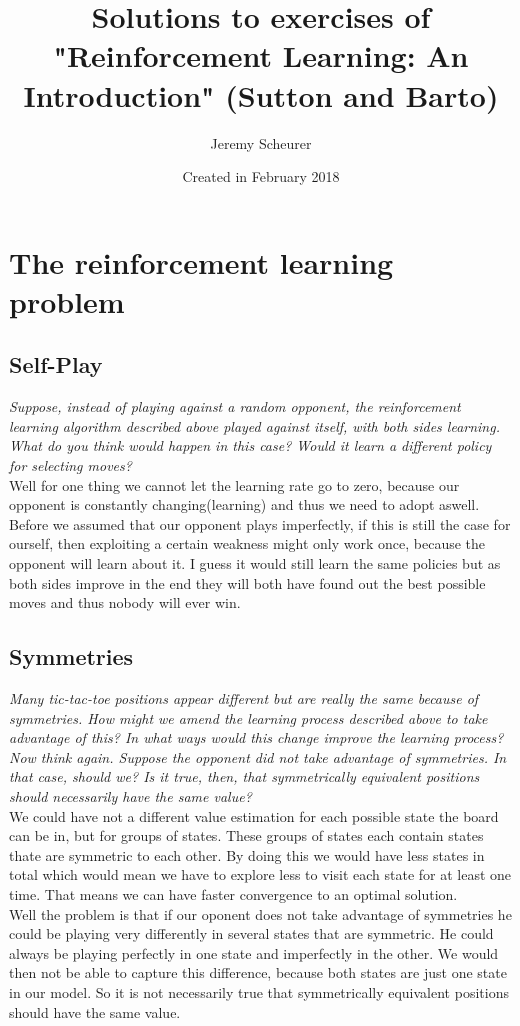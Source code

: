 \documentclass[12pt,a4paper]{article}
\author{Jeremy Scheurer}
\title{Solutions to exercises of "Reinforcement Learning: An Introduction" (Sutton and Barto)}
\date{Created in February 2018}
\begin{document}
\maketitle
\tableofcontents
\newpage
	
\section{The reinforcement learning problem}
\subsection{Self-Play }
\textit{Suppose, instead of playing against a random opponent, the reinforcement learning algorithm 		described above played against itself, with both sides learning. What do you think would happen in this case? Would it learn a different policy for selecting moves?}\\

Well for one thing we cannot let the learning rate go to zero, because our opponent is constantly changing(learning) and thus we need to adopt aswell. Before we assumed that our opponent plays imperfectly, if this is still the case for ourself, then exploiting a certain weakness might only work once, because the opponent will learn about it. I guess it would still learn the same policies but as both sides improve in the end they will both have found out the best possible moves and thus nobody will ever win.

\subsection{Symmetries}
\textit{Many tic-tac-toe positions appear different but are really the same because of symmetries. How might we amend the learning process described above to take advantage of this? In what ways would this change improve the learning process? Now think again. Suppose the opponent did not take advantage of symmetries. In that case, should we? Is it true, then, that symmetrically equivalent positions should necessarily have the same value?} \\ 

We could have not a different value estimation for each possible state the board can be in, but for groups of states. These groups of states each contain states thate are symmetric to each other. By doing this we would have less states in total which would mean we have to explore less to visit each state for at least one time. That means we can have faster convergence to an optimal solution. \\
Well the problem is that if our oponent does not take advantage of symmetries he could be playing very differently in several states that are symmetric. He could always be playing perfectly in one state and imperfectly in the other. We would then not be able to capture this difference, because both states are just one state in our model. So it is not necessarily true that symmetrically equivalent positions should have the same value.
\end{document}
